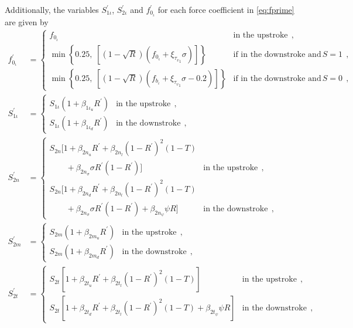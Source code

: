 \documentclass[12pt,a4paper,oneside,english]{abntex2} %
\def\lb{\left[}
\def\rb{\right]}
\def\lp{\left(}
\def\rp{\right)}
\begin{document}
Additionally, the variables $S_{1\iota}^\prime$, $S_{2\iota}^\prime$ and $f_{0_\iota}^\prime$ for each force coefficient in \cref{eq:fprime} are given by
\begin{align}
    f_{0_\iota}^\prime &= 
    \begin{cases} 
    f_{0_\iota} & \text{in the upstroke} \ \ ,
    \\
    \min \left\{0.25 ,\; \lb\lp1-\sqrt{R}\rp\lp f_{0_\iota}+\xi_{{\tau_v}_1}\sigma\rp\rb\right\} &\text{if in the downstroke and } S = 1 \ \ ,
    \\
    \min \left\{0.25 ,\; \lb\lp1-\sqrt{R}\rp\lp f_{b_\iota}+\xi_{{\tau_v}_1}\sigma-0.2\rp\rb\right\} &\text{if in the downstroke and } S = 0 \ \ ,
    \end{cases}
    \label{eq:f0_prime}
    \\
    S_{1\iota}^\prime &= 
    \begin{cases}       S_{1\iota}\lp1+\beta_{1\iota_u}R^\prime\rp &\text{in the upstroke} \ \ , 
    \\
    S_{1\iota}\lp1+\beta_{1\iota_d}R^\prime\rp &\text{in the downstroke} \ \ ,
    \end{cases}
    \label{eq:S1_prime} 
    \\
    S_{2n}^\prime &=  
    \begin{cases}       
    S_{2n} \bigg[ 1 + \beta_{2n_u}R^\prime + \beta_{2n_l}(1-R^\prime)^2(1-T) \\  
    \qquad + \beta_{2n_\sigma}\sigma R^\prime(1-R^\prime) \bigg] & \text{in the upstroke} \ \ ,
    \\ 	
    S_{2n} \bigg[ 1 + \beta_{2n_d}R^\prime + \beta_{2n_l}(1-R^\prime)^2(1-T) \\  
    \qquad + \beta_{2n_\sigma}\sigma R^\prime(1-R^\prime) + \beta_{2n_\psi}\psi R \bigg] & \text{in the downstroke} \ \ ,
    \end{cases}
    \label{eq:S2n_prime}
    \\
    S_{2m}^\prime &=
    \begin{cases}       S_{2m}\lp1+\beta_{2m_u}R^\prime\rp &\text{in the upstroke} \ \ ,
    \\ S_{2m}\lp1+\beta_{2m_d}R^\prime\rp &\text{in the downstroke} \ \ ,
    \end{cases}
    \label{eq:S2m_prime}
    \\
    S_{2t}^\prime &=
    \begin{cases}      
    S_{2t} \lb 1+\beta_{2t_u}R^\prime + \beta_{2t_l}\lp1-R^\prime\rp^2\lp1-T\rp \rb &\text{in the upstroke} \ \ ,
    \\ 
    S_{2t} \lb 1 + \beta_{2t_d}R^\prime + \beta_{2t_l}\lp1-R^\prime\rp^2\lp1-T\rp + \beta_{2t_\psi}\psi R \rb &\text{in the downstroke} \ \ ,
    \end{cases}
    \label{eq:S2t_prime}
\end{align}
\end{document}
